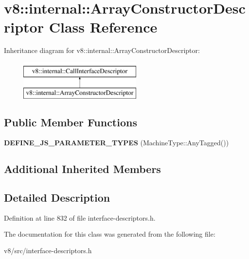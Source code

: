 \hypertarget{classv8_1_1internal_1_1ArrayConstructorDescriptor}{}\section{v8\+:\+:internal\+:\+:Array\+Constructor\+Descriptor Class Reference}
\label{classv8_1_1internal_1_1ArrayConstructorDescriptor}
Inheritance diagram for v8\+:\+:internal\+:\+:Array\+Constructor\+Descriptor\+:\begin{figure}[H]
\begin{center}
\leavevmode
\includegraphics[height=2.000000cm]{classv8_1_1internal_1_1ArrayConstructorDescriptor}
\end{center}
\end{figure}
\subsection*{Public Member Functions}
\begin{DoxyCompactItemize}
\item 
\mbox{\label{classv8_1_1internal_1_1ArrayConstructorDescriptor_a8d9ffd4e97f80033ddc7a0b5ce8cba86}} 
{\bfseries D\+E\+F\+I\+N\+E\+\_\+\+J\+S\+\_\+\+P\+A\+R\+A\+M\+E\+T\+E\+R\+\_\+\+T\+Y\+P\+ES} (Machine\+Type\+::\+Any\+Tagged())
\end{DoxyCompactItemize}
\subsection*{Additional Inherited Members}


\subsection{Detailed Description}


Definition at line 832 of file interface-\/descriptors.\+h.



The documentation for this class was generated from the following file\+:\begin{DoxyCompactItemize}
\item 
v8/src/interface-\/descriptors.\+h\end{DoxyCompactItemize}
